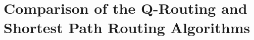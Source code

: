 \documentclass{standalone}
\begin{document}
\thesistranslationoriginal
\section{Comparison of the Q-Routing and Shortest Path Routing Algorithms}

\begin{figure}[H]
    \centering

\end{figure}




\end{document}
